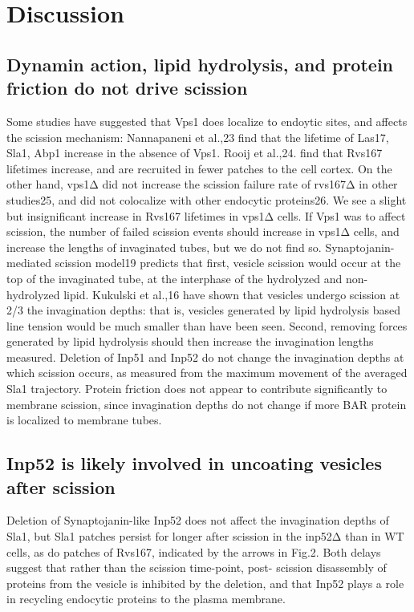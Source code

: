 
\chapter{Discussion}    
\label{Ch:discussion}

\section{Dynamin action, lipid hydrolysis, and protein friction do not drive scission}
Some studies have suggested that Vps1 does localize to endoytic sites, and affects the scission mechanism: Nannapaneni et al.,23 find that the lifetime of Las17, Sla1, Abp1 increase in the absence of Vps1. Rooij et al.,24. find that Rvs167 lifetimes increase, and are recruited in fewer patches to the cell cortex. On the other hand, vps1Δ did not increase the scission failure rate of rvs167Δ in other studies25, and did not colocalize with other endocytic proteins26. We see a slight but insignificant increase in Rvs167 lifetimes in vps1Δ cells. If Vps1 was to affect scission, the number of failed scission events should increase in vps1Δ cells, and increase the lengths of invaginated tubes, but we do not find so. Synaptojanin-mediated scission model19 predicts that first, vesicle scission would occur at the top of the invaginated tube, at the interphase of the hydrolyzed and non-hydrolyzed lipid. Kukulski et al.,16 have shown that vesicles undergo scission at 2/3 the invagination depths: that is, vesicles generated by lipid hydrolysis based line tension would be much smaller than have been seen. Second, removing forces generated by lipid hydrolysis should then increase the invagination lengths measured. Deletion of Inp51 and Inp52 do not change the invagination depths at which scission occurs, as measured from the maximum movement of the averaged Sla1 trajectory. Protein friction does not appear to contribute significantly to membrane scission, since invagination depths do not change if more BAR protein is localized to membrane tubes.


\section{Inp52 is likely involved in uncoating vesicles after scission}
Deletion of Synaptojanin-like Inp52 does not affect the invagination depths of Sla1, but Sla1 patches persist for longer after scission in the inp52Δ than in WT cells, as do patches of Rvs167, indicated by the arrows in Fig.2. Both delays suggest that rather than the scission time-point, post- scission disassembly of proteins from the vesicle is inhibited by the deletion, and that Inp52 plays a role in recycling endocytic proteins to the plasma membrane.

